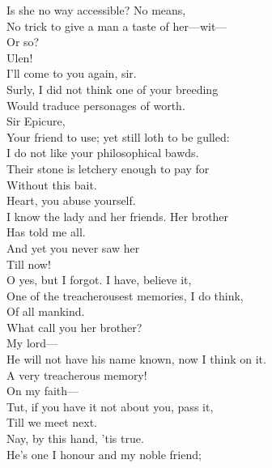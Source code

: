 \documentclass[a4paper,oneside,12pt]{memoir}
\begin{document}
\begin{drama*}
\mammonspeaks Is she no way accessible? No means,\\
No trick to give a man a taste of her---wit---\\
Or so?\\
\subtlespeaks {}  Ulen!\\
\facespeaks {} I'll come to you again, sir.\\
\mammonspeaks Surly, I did not think one of your breeding\\
Would traduce personages of worth.\\
\surlyspeaks {} Sir Epicure,\\
Your friend to use; yet still loth to be gulled:\\
I do not like your philosophical bawds.\\
Their stone is letchery enough to pay for\\
Without this bait.\\
\mammonspeaks {} Heart, you abuse yourself.\\
I know the lady and her friends. Her brother\\
Has told me all.\\
\surlyspeaks {} And yet you never saw her\\
Till now!\\
\mammonspeaks {} O yes, but I forgot. I have, believe it,\\
One of the treacherousest memories, I do think,\\
Of all mankind.\\
\surlyspeaks {} What call you her brother?\\
\mammonspeaks {} My lord---\\
He will not have his name known, now I think on it.\\
\surlyspeaks A very treacherous memory!\\
\mammonspeaks {} On my faith---\\
\surlyspeaks Tut, if you have it not about you, pass it,\\
Till we meet next.\\
\mammonspeaks {} Nay, by this hand, 'tis true.\\
He's one I honour and my noble friend;\\

\end{drama*}
\end{document}
